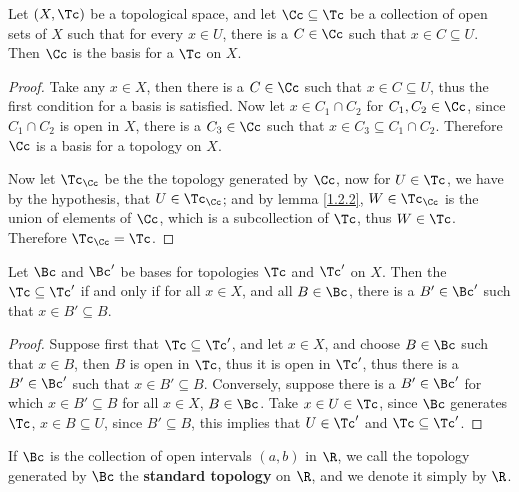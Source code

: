 \begin{lemma}\label{1.2.3}
    Let $(X,\Tc)$ be a topological space, and let  $\Cc \subseteq \Tc$ be a collection
    of open sets of  $X$ such that for every  $x \in U$, there is a  $C \in \Cc$ such that
    $x \in  C \subseteq U$. Then  $\Cc$ is the basis for a $\Tc$ on  $X$.
\end{lemma}
\begin{proof}
    Take any $x \in X$, then there is a  $C \in \Cc$ such that 	$x \in C \subseteq U$,
    thus the first condition for a basis is satisfied. Now let  $x \in C_1 \cap C_2$ for
    $C_1, C_2 \in \Cc$, since $C_1 \cap C_2$ is open in $X$, there is a  $C_3 \in \Cc$ such that
    $x \in C_3 \subseteq C_1 \cap C_2$. Therefore $\Cc$ is a basis for a topology on  $X$.

    Now let $\Tc_\Cc$ be the the topology generated by  $\Cc$, now for  $U \in \Tc$, we have
    by the hypothesis, that  $U \in \Tc_\Cc$; and by lemma \ref{1.2.2},  $W \in \Tc_\Cc$ is the
    union of elements of  $\Cc$, which is a subcollection of  $\Tc$, thus  $W \in \Tc$. Therefore
     $\Tc_\Cc=\Tc$.
\end{proof}

\begin{lemma}\label{1.2.4}
    Let $\Bc$ and  $\Bc'$ be bases for topologies  $\Tc$ and  $\Tc'$ on  $X$. Then the
     $\Tc \subseteq \Tc'$ if and only if for all  $x \in X$, and all  $B \in \Bc$, there is a  $B' \in \Bc'$
     such that  $x \in B' \subseteq B$.
\end{lemma}
\begin{proof}
    Suppose first that $\Tc \subseteq \Tc'$, and let $x \in X$, and choose  $B \in \Bc$ such that
    $x \in B$, then  $B$ is open in  $\Tc$, thus it is open in  $\Tc'$, thus there is a
     $B' \in \Bc'$ such that  $x \in B' \subseteq B$. Conversely, suppose there is a  $B' \in \Bc'$
     for which  $x \in B' \subseteq B$ for all  $x \in X$,  $B \in \Bc$. Take  $x \in U \in \Tc$, since
      $\Bc$ generates  $\Tc$,  $x \in B \subseteq U$, since  $B' \subseteq B$, this implies that $U \in \Tc'$
      and $\Tc \subseteq \Tc'$.
\end{proof}

\begin{definition}
    If $\Bc$ is the collection of open intervals $(a,b)$ in  $\R$, we call the topology generated
    by  $\Bc$ the \textbf{standard topology} on $\R$, and we denote it simply by  $\R$.
\end{definition}


